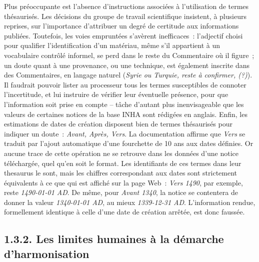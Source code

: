 \documentclass[a4paper,12pt, twoside]{book}
\begin{document}
Plus préoccupante est l’absence d’instructions associées à l’utilisation de termes thésaurisés. Les décisions du groupe de travail scientifique insistent, à plusieurs reprises, sur l’importance d’attribuer un degré de certitude aux informations publiées. Toutefois, les voies empruntées s’avèrent inefficaces~: l’adjectif choisi pour qualifier l’identification d’un matériau, même s’il appartient à un vocabulaire contrôlé informel, se perd dans le reste du \textsf{Commentaire} où il figure~; un doute quant à une provenance, ou une technique, est également inscrite dans des \textsf{Commentaires}, en langage naturel (\textit{Syrie ou Turquie, reste à confirmer, (?)}). Il faudrait pouvoir lister au processeur tous les termes susceptibles de connoter l’incertitude, et lui instruire de vérifier leur éventuelle présence, pour que l’information soit prise en compte – tâche d’autant plus inenvisageable que les valeurs de certaines notices de la base INHA sont rédigées en anglais. Enfin, les estimations de dates de création disposent bien de termes thésaurisés pour indiquer un doute~: \textit{Avant, Après, Vers}. La documentation affirme que \textit{Vers} se traduit par l’ajout automatique d’une fourchette de 10 ans aux dates définies. Or aucune trace de cette opération ne se retrouve dans les données d’une notice téléchargée, quel qu’en soit le format. Les identifiants de ces termes dans leur thesaurus le sont, mais les chiffres correspondant aux dates sont strictement équivalents à ce que qui est affiché sur la page Web~: \textit{Vers 1490}, par exemple, reste \textit{1490-01-01 AD}. De même, pour \textit{Avant 1340}, la notice se contentera de donner la valeur \textit{1340-01-01 AD}, au mieux \textit{1339-12-31 AD}. L’information rendue, formellement identique à celle d’une date de création arrêtée, est donc faussée.

\subsection*{1.3.2. Les limites humaines à la démarche d’harmonisation}
\end{document}
